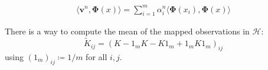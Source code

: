 \documentclass[10pt,landscape]{article}
\begin{document}
\begin{multicols}{3}
\begin{align*}
\langle \mathbf{v}^n, \mathbf{\Phi}(x) \rangle = \sum_{i=1}^{m} \alpha_i^{n} \langle \mathbf{\Phi}(x_i), \mathbf{\Phi}(x) \rangle
\end{align*}

There is a way to compute the mean of the mapped observations in $\mathcal{H}$:
\begin{equation*}
\tilde{K}_{ij} = (K - 1_m K - K 1_m + 1_m K 1_m )_{ij}
\end{equation*}
using $(1_m)_{ij} \coloneq 1/m$ for all $i,j$.
\end{multicols}
\end{document}
